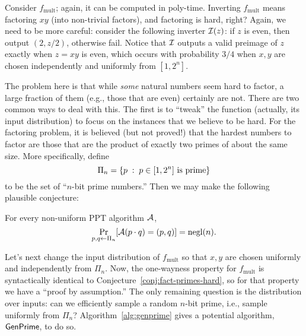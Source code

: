 \documentclass[11pt]{article}
\begin{document}
Consider $f_{\text{mult}}$; again, it can be computed in
poly-time.  Inverting $f_{\text{mult}}$ means factoring $xy$ (into
non-trivial factors), and factoring is hard, right?  Again, we need to
be more careful: consider the following inverter $\mathcal{I}(z)$: if $z$ is
even, then output $(2, z/2)$, otherwise fail.  Notice that $\mathcal{I}$
outputs a valid preimage of $z$ exactly when $z = xy$ is even, which
occurs with probability $3/4$ when $x, y$ are chosen independently and
uniformly from $[1,2^{n}]$.

The problem here is that while \emph{some} natural numbers seem hard
to factor, a large fraction of them (e.g., those that are even)
certainly are not.  There are two common ways to deal with this.  The
first is to ``tweak'' the function (actually, its input distribution)
to focus on the instances that we believe to be hard.  For the
factoring problem, it is believed (but not proved!) that the hardest
numbers to factor are those that are the product of exactly two primes
of about the same size.  More specifically, define \[ \Pi_{n} = \{
  p\; :\; p \in [1,2^{n}] \text{ is prime}\} \] to be the set of
``$n$-bit prime numbers.''  Then we may make the following plausible
conjecture:

\begin{conjecture}
  \label{conj:fact-primes-hard}
  For every non-uniform PPT algorithm $\mathcal{A}$,
  \[ \Pr_{p,q \gets \Pi_{n}} [\mathcal{A}(p \cdot q) = (p,q)] = \operatorname{negl}(n). \]
\end{conjecture}

Let's next change the input distribution of $f_{\text{mult}}$ so that
$x,y$ are chosen uniformly and independently from $\Pi_{n}$.  Now, the
one-wayness property for $f_{\text{mult}}$ is syntactically identical
to Conjecture~\ref{conj:fact-primes-hard}, so for that property we
have a ``proof by assumption.''  The only remaining question is the
distribution over inputs: can we efficiently sample a random $n$-bit
prime, i.e., sample uniformly from $\Pi_{n}$?
Algorithm~\ref{alg:genprime} gives a potential algorithm,
$\mathsf{GenPrime}$, to do so.
\end{document}

